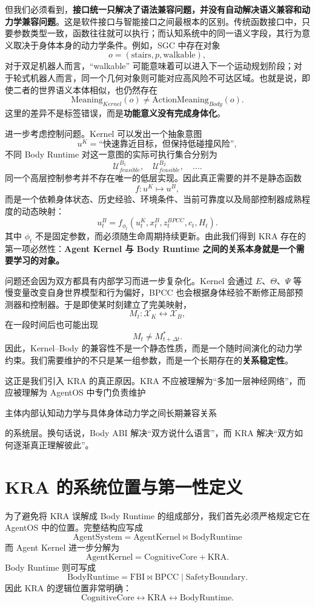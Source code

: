 但我们必须看到，\textbf{接口统一只解决了语法兼容问题，并没有自动解决语义兼容和动力学兼容问题}。这是软件接口与智能接口之间最根本的区别。传统函数接口中，只要参数类型一致，函数往往就可以执行；而认知系统中的同一语义字段，其行为意义取决于身体本身的动力学条件。例如，SGC 中存在对象
\[
o=(\mathrm{stairs},p,\mathrm{walkable}),
\]
对于双足机器人而言，``walkable'' 可能意味着可以进入下一个运动规划阶段；对于轮式机器人而言，同一个几何对象则可能对应高风险不可达区域。也就是说，即使二者的世界语义本体相似，也仍然存在
\[
\mathrm{Meaning}_{Kernel}(o)
\neq
\mathrm{ActionMeaning}_{Body}(o).
\]
这里的差异不是标签错误，而是\textbf{功能意义没有完成身体化}。

进一步考虑控制问题。Kernel 可以发出一个抽象意图
\[
u^{K}
=
\text{``快速靠近目标，但保持低碰撞风险''},
\]
不同 Body Runtime 对这一意图的实际可执行集合分别为
\[
\mathcal U^{B_1}_{feasible},
\quad
\mathcal U^{B_2}_{feasible},
\quad
\dots .
\]
同一个高层控制参考并不存在唯一的低层实现。因此真正需要的并不是静态函数
\[
f:u^{K}\mapsto u^{B},
\]
而是一个依赖身体状态、历史经验、环境条件、当前可靠度以及局部控制器成熟程度的动态映射：
\[
u^{B}_t
=
f_{\phi_t}
\left(
u^{K}_t,
x^{B}_t,
z^{BPCC}_t,
c_t,
H_t
\right).
\]
其中 $\phi_t$ 不是固定参数，而必须随生命周期持续更新。由此我们得到 KRA 存在的第一项必然性：\textbf{Agent Kernel 与 Body Runtime 之间的关系本身就是一个需要学习的对象。}

问题还会因为双方都具有内部学习而进一步复杂化。Kernel 会通过 $E$、$\Theta$、$\Psi$ 等慢变量改变自身世界模型和行为偏好，BPCC 也会根据身体经验不断修正局部预测器和控制器。于是即使某时刻建立了完美映射，
\[
M_t:
\mathcal X_K
\leftrightarrow
\mathcal X_B,
\]
在一段时间后也可能出现
\[
M_t
\neq
M_{t+\Delta t}^{*}.
\]
因此，Kernel--Body 的兼容性不是一个静态性质，而是一个随时间演化的动力学约束。我们需要维护的不只是某一组参数，而是一个长期存在的\textbf{关系稳定性}。

这正是我们引入 KRA 的真正原因。KRA 不应被理解为``多加一层神经网络''，而应被理解为 AgentOS 中专门负责维护
\begin{statementbox}
主体内部认知动力学与具体身体动力学之间长期兼容关系
\end{statementbox}
的系统层。换句话说，Body ABI 解决``双方说什么语言''，而 KRA 解决``双方如何逐渐真正理解彼此''。

\section{KRA 的系统位置与第一性定义}
\label{sec:kra-position-definition}

为了避免将 KRA 误解成 Body Runtime 的组成部分，我们首先必须严格规定它在 AgentOS 中的位置。完整结构应写成
\[
\boxed{
\mathrm{AgentSystem}
=
\mathrm{AgentKernel}
\bowtie
\mathrm{BodyRuntime}
}
\]
而 Agent Kernel 进一步分解为
\[
\boxed{
\mathrm{AgentKernel}
=
\mathrm{CognitiveCore}
+
\mathrm{KRA}.
}
\]
Body Runtime 则可写成
\[
\mathrm{BodyRuntime}
=
\mathrm{FBI}
\bowtie
\mathrm{BPCC}
\mid
\mathrm{SafetyBoundary}.
\]
因此 KRA 的逻辑位置非常明确：
\[
\mathrm{CognitiveCore}
\longleftrightarrow
\boxed{\mathrm{KRA}}
\longleftrightarrow
\mathrm{BodyRuntime}.
\]

